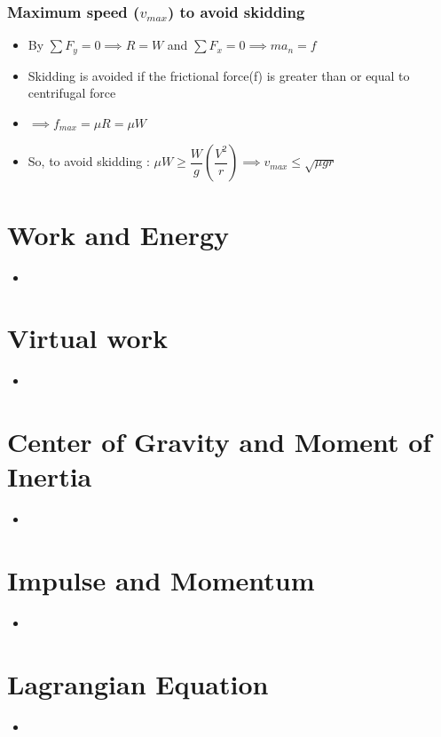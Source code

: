 \documentclass[8pt]{report}
\begin{document}
	\subsection{Maximum speed ($v_{max}$) to avoid skidding}
		\begin{itemize}
			\item By $\sum F_y = 0 \implies R = W$ and $\sum F_x=0 \implies ma_n=f$
			\item Skidding is avoided if the frictional force(f) is greater than or equal to centrifugal force
			\item $\implies f_{max} = \mu R = \mu W$
			\item So, to avoid skidding : $\mu W \geq \dfrac{W}{g}\left(\dfrac{V^2}{r}\right) \implies \boxed{v_{max}\le\sqrt{\mu gr}}$
		\end{itemize}\hrulefill
\chapter{Work and Energy}
	\begin{itemize}
		\item
	\end{itemize}
\chapter{Virtual work}
	\begin{itemize}
		\item
	\end{itemize}
\chapter{Center of Gravity and Moment of Inertia}
	\begin{itemize}
		\item
	\end{itemize}
\chapter{Impulse and Momentum}
	\begin{itemize}
		\item
	\end{itemize}
\chapter{Lagrangian Equation}
	\begin{itemize}
		\item
	\end{itemize}
\end{document}
